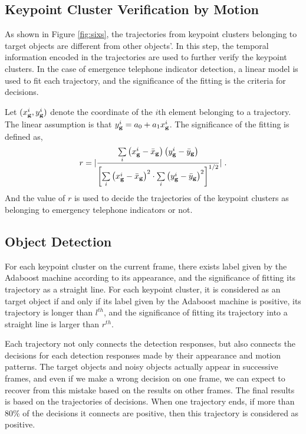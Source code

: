 \subsection{Keypoint Cluster Verification by Motion}
As shown in Figure \ref{fig:sixs}, the trajectories from keypoint clusters belonging to target objects are different from other objects'. In this step, the temporal information encoded in the trajectories are used to further verify the keypoint clusters. In the case of emergence telephone indicator detection, a linear model is used to fit each trajectory, and the significance of the fitting is the criteria for decisions. 

Let $(x^i_{\bf{g}},y^i_{\bf{g}})$ denote the coordinate of the $i$th element belonging to a trajectory. The linear assumption is that $y^i_{\bf{g}}=a_0+a_1{x^i_{\bf{g}}}$. The significance of the fitting is defined as,
\begin{equation}
r =| \frac{{\sum\limits_i {\left( {{x^i_{\bf{g}}} -  {\bar x_{\bf{g}}}} \right)\left( {{y^i_{\bf{g}}} -  {\bar y_{\bf{g}}}} \right)} }}{{{{\left[ {\sum\limits_i {{{\left( {{x^i_{\bf{g}}} -  {\bar x_{\bf{g}}}} \right)}^2} \cdot \sum\limits_i {{{\left( {{y^i_{\bf{g}}} -  {\bar y_{\bf{g}}}} \right)}^2}} } } \right]}^{1/2}}}}|\;.
\label{eq4}
\end{equation}
And the value of $r$ is used to decide the trajectories of the keypoint clusters as belonging to emergency telephone indicators or not.

\subsection{Object Detection}
For each keypoint cluster on the current frame, there exists label given by the Adaboost machine according to its appearance, and the significance of fitting its trajectory as a straight line.  For each keypoint cluster, it is considered as an target object if and only if its label given by the Adaboost machine is positive, its trajectory is longer than $l^{th}$, and the significance of fitting its trajectory into a straight line is larger than $r^{th}$.

Each trajectory not only connects the detection responses, but also connects the decisions for each detection responses made by their appearance and motion patterns. The target objects and noisy objects actually appear in successive frames, and even if we make a wrong decision on one frame, we can expect to recover from this mistake based on the results on other frames. The final results is based on the trajectories of decisions. When one trajectory ends, if more than 80\% of the decisions it connects are positive, then this trajectory is considered as positive.



